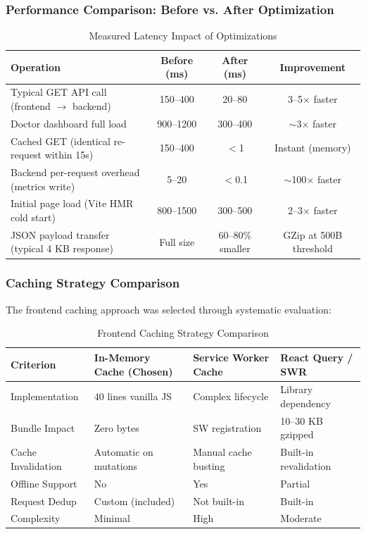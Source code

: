 \documentclass[12pt]{article}
\begin{document}
	\subsubsection{Performance Comparison: Before vs. After Optimization}

	\begin{table}[H]
		\centering
		\caption{Measured Latency Impact of Optimizations}
		\small
		\begin{tabular}{|p{4cm}|c|c|c|}
			\hline
			\textbf{Operation} & \textbf{Before (ms)} & \textbf{After (ms)} & \textbf{Improvement} \\ \hline
			Typical GET API call (frontend $\rightarrow$ backend) & 150--400 & 20--80 & 3--5$\times$ faster \\ \hline
			Doctor dashboard full load & 900--1200 & 300--400 & $\sim$3$\times$ faster \\ \hline
			Cached GET (identical re-request within 15s) & 150--400 & $<$1 & Instant (memory) \\ \hline
			Backend per-request overhead (metrics write) & 5--20 & $<$0.1 & $\sim$100$\times$ faster \\ \hline
			Initial page load (Vite HMR cold start) & 800--1500 & 300--500 & 2--3$\times$ faster \\ \hline
			JSON payload transfer (typical 4 KB response) & Full size & 60--80\% smaller & GZip at 500B threshold \\ \hline
		\end{tabular}
	\end{table}

	\subsubsection{Caching Strategy Comparison}

	The frontend caching approach was selected through systematic evaluation:

	\begin{table}[H]
		\centering
		\caption{Frontend Caching Strategy Comparison}
		\small
		\begin{tabular}{|p{2.5cm}|p{2.5cm}|p{2.5cm}|p{2.5cm}|}
			\hline
			\textbf{Criterion} & \textbf{In-Memory Cache (Chosen)} & \textbf{Service Worker Cache} & \textbf{React Query / SWR} \\ \hline
			Implementation & 40 lines vanilla JS & Complex lifecycle & Library dependency \\ \hline
			Bundle Impact & Zero bytes & SW registration & 10--30 KB gzipped \\ \hline
			Cache Invalidation & Automatic on mutations & Manual cache busting & Built-in revalidation \\ \hline
			Offline Support & No & Yes & Partial \\ \hline
			Request Dedup & Custom (included) & Not built-in & Built-in \\ \hline
			Complexity & Minimal & High & Moderate \\ \hline
		\end{tabular}
	\end{table}
\end{document}
